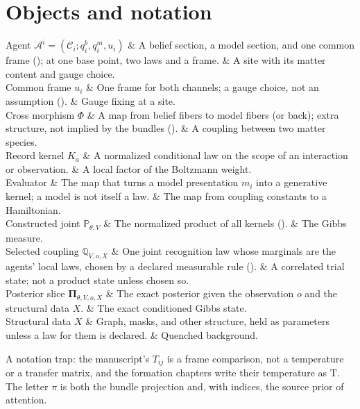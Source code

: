 \section{Objects and notation}
\label{comp:ch01-objects}

\begin{decoder}
Agent $\mathcal A^i=(\mathcal C_i;q_i^b,q_i^m,u_i)$ & A belief section, a model section, and one common frame (); at one base point, two laws and a frame. & A site with its matter content and gauge choice. \\
Common frame $u_i$ & One frame for both channels; a gauge choice, not an assumption (). & Gauge fixing at a site. \\
Cross morphism $\Phi$ & A map from belief fibers to model fibers (or back); extra structure, not implied by the bundles (). & A coupling between two matter species. \\
Record kernel $K_a$ & A normalized conditional law on the scope of an interaction or observation. & A local factor of the Boltzmann weight. \\
Evaluator & The map that turns a model presentation $m_i$ into a generative kernel; a model is not itself a law. & The map from coupling constants to a Hamiltonian. \\
Constructed joint $\mathbb P_{\theta,V}$ & The normalized product of all kernels (). & The Gibbs measure. \\
Selected coupling $\mathbb Q_{V,o,X}$ & One joint recognition law whose marginals are the agents' local laws, chosen by a declared measurable rule (). & A correlated trial state; not a product state unless chosen so. \\
Posterior slice $\boldsymbol\Pi_{\theta,V,o,X}$ & The exact posterior given the observation $o$ and the structural data $X$. & The exact conditioned Gibbs state. \\
Structural data $X$ & Graph, masks, and other structure, held as parameters unless a law for them is declared. & Quenched background. \\
\end{decoder}

A notation trap: the manuscript's $T_{ij}$ is a frame comparison, not a temperature or a transfer
matrix, and the formation chapters write their temperature as $\mathrm T$. The letter $\pi$ is both
the bundle projection and, with indices, the source prior of attention.

